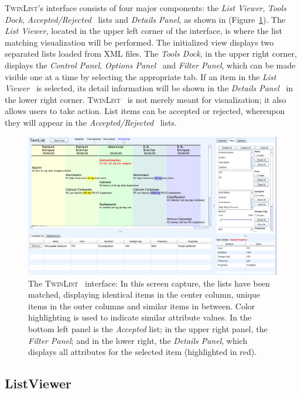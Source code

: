 \documentclass{chi2009}
\newcommand{\TwinList}{\textsc{TwinList}}
\newcommand{\ListViewer}{\textit{List Viewer}}
\newcommand{\AcceptedRejected}{\textit{Accepted/Rejected}}
\newcommand{\Details}{\textit{Details Panel}}
\newcommand{\Tools}{\textit{Tools Dock}}
\newcommand{\Controls}{\textit{Control Panel}}
\newcommand{\Filters}{\textit{Filter Panel}}
\newcommand{\Options}{\textit{Options Panel}}
\begin{document}
\TwinList's interface consists of four major components: the \ListViewer, \Tools, \AcceptedRejected~ lists and \Details, as shown in (Figure~\ref{fig:interface}). The \ListViewer, located in the upper left corner of the interface, is where the list matching visualization will be performed. The initialized view displays two separated lists loaded from XML files. The \Tools, in the upper right corner, displays the \Controls, \Options~ and \Filters, which can be made visible one at a time by selecting the appropriate tab. If an item in the \ListViewer~ is selected, its detail information will be shown in the \Details~ in the lower right corner. \TwinList~ is not merely meant for visualization; it also allows users to take action. List items can be accepted or rejected, whereupon they will appear in the \AcceptedRejected~ lists.

\begin{figure}
\begin{center}
\includegraphics[width=1\linewidth]{img/interface2.png}
\end{center}
   \caption{The \TwinList~ interface: In this screen capture, the lists have been matched, displaying identical items in the center column, unique items in the outer columns and similar items in between. Color highlighting is used to indicate similar attribute values. In the bottom left panel is the \textit{Accepted} list; in the upper right panel, the \Filters; and in the lower right, the \Details, which displays all attributes for the selected item (highlighted in red).}
   \label{fig:interface}
\end{figure}

\subsection{ListViewer}
 
\end{document}
